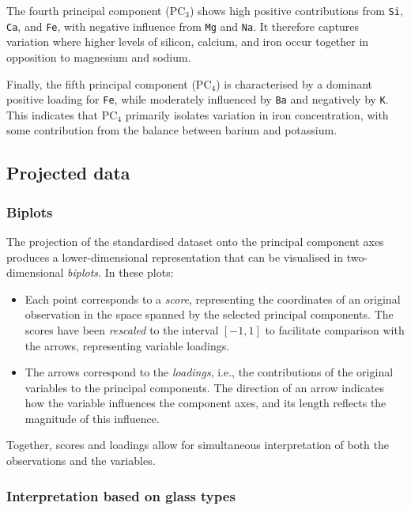 \documentclass[dtu]{dtuarticle}
\begin{document}
	The fourth principal component ($\text{PC}_3$) shows high positive contributions from \texttt{Si}, \texttt{Ca}, and \texttt{Fe}, with negative influence from \texttt{Mg} and \texttt{Na}. It therefore captures variation where higher levels of silicon, calcium, and iron occur together in opposition to magnesium and sodium.

	Finally, the fifth principal component ($\text{PC}_4$) is characterised by a dominant positive loading for \texttt{Fe}, while moderately influenced by \texttt{Ba} and negatively by \texttt{K}. This indicates that $\text{PC}_4$ primarily isolates variation in iron concentration, with some contribution from the balance between barium and potassium.

	\subsection{Projected data}

	\subsubsection{Biplots}

	The projection of the standardised dataset onto the principal component axes produces a lower-dimensional representation that can be visualised in two-dimensional \textit{biplots}. In these plots:

	\begin{itemize}
		\item Each point corresponds to a \textit{score}, representing the coordinates of an original observation in the space spanned by the selected principal components. The scores have been \textit{rescaled} to the interval $[-1,1]$ to facilitate comparison with the arrows, representing variable loadings.
		\item The arrows correspond to the \textit{loadings}, i.e., the contributions of the original variables to the principal components. The direction of an arrow indicates how the variable influences the component axes, and its length reflects the magnitude of this influence.
	\end{itemize}

	Together, scores and loadings allow for simultaneous interpretation of both the observations and the variables.

	\subsubsection{Interpretation based on glass types}
\end{document}
